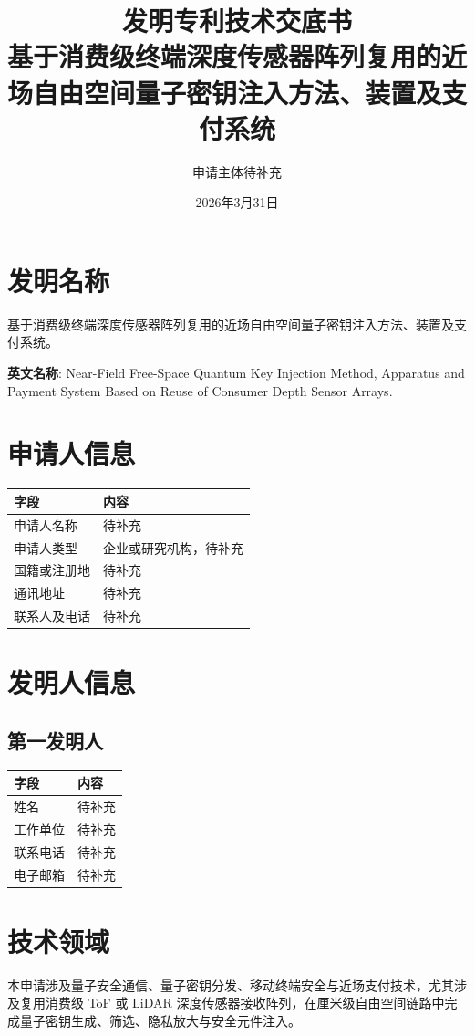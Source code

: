 ﻿\documentclass[12pt,a4paper]{article}
\title{\textbf{发明专利技术交底书}\\[0.5em]\Large 基于消费级终端深度传感器阵列复用的近场自由空间量子密钥注入方法、装置及支付系统}
\author{申请主体待补充}
\date{2026年3月31日}
\begin{document}
\maketitle
\tableofcontents
\newpage
\section{发明名称}
基于消费级终端深度传感器阵列复用的近场自由空间量子密钥注入方法、装置及支付系统。

\textbf{英文名称}: Near-Field Free-Space Quantum Key Injection Method, Apparatus and Payment System Based on Reuse of Consumer Depth Sensor Arrays.

\section{申请人信息}
\begin{tabular}{|p{4cm}|p{8cm}|}
\hline
字段 & 内容 \\
\hline
申请人名称 & 待补充 \\
\hline
申请人类型 & 企业或研究机构，待补充 \\
\hline
国籍或注册地 & 待补充 \\
\hline
通讯地址 & 待补充 \\
\hline
联系人及电话 & 待补充 \\
\hline
\end{tabular}

\section{发明人信息}
\subsection{第一发明人}
\begin{tabular}{|p{4cm}|p{8cm}|}
\hline
字段 & 内容 \\
\hline
姓名 & 待补充 \\
\hline
工作单位 & 待补充 \\
\hline
联系电话 & 待补充 \\
\hline
电子邮箱 & 待补充 \\
\hline
\end{tabular}

\section{技术领域}
本申请涉及量子安全通信、量子密钥分发、移动终端安全与近场支付技术，尤其涉及复用消费级 ToF 或 LiDAR 深度传感器接收阵列，在厘米级自由空间链路中完成量子密钥生成、筛选、隐私放大与安全元件注入。
\end{document}
